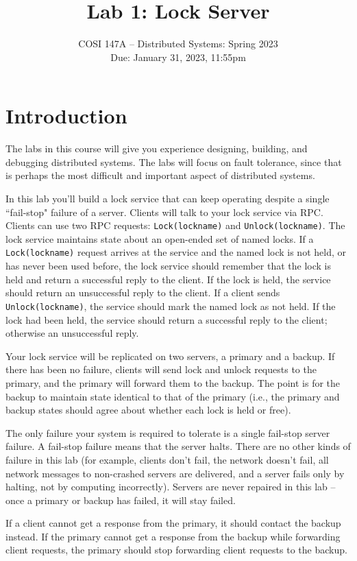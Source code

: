 \documentclass{article}
\title{Lab 1: Lock Server}
\author{COSI 147A -- Distributed Systems: Spring 2023 \\
        Due: January 31, 2023, 11:55pm}
\date{}
\newcommand{\code}{\texttt}
\begin{document}
\maketitle


\section{Introduction}
The labs in this course will give you experience designing, building, and debugging distributed systems. The labs will focus on fault tolerance, since that is perhaps the most difficult and important aspect of distributed systems.

In this lab you'll build a lock service that can keep operating despite a single ``fail-stop" failure of a server. Clients will talk to your lock service via RPC. Clients can use two RPC requests: \code{Lock(lockname)} and \code{Unlock(lockname)}. The lock service maintains state about an open-ended set of named locks. If a \code{Lock(lockname)} request arrives at the service and the named lock is not held, or has never been used before, the lock service should remember that the lock is held and return a successful reply to the client. If the lock is held, the service should return an unsuccessful reply to the client. If a client sends \code{Unlock(lockname)}, the service should mark the named lock as not held. If the lock had been held, the service should return a successful reply to the client; otherwise an unsuccessful reply.

Your lock service will be replicated on two servers, a primary and a backup. If there has been no failure, clients will send lock and unlock requests to the primary, and the primary will forward them to the backup. The point is for the backup to maintain state identical to that of the primary (i.e., the primary and backup states should agree about whether each lock is held or free).

The only failure your system is required to tolerate is a single fail-stop server failure. A fail-stop failure means that the server halts. There are no other kinds of failure in this lab (for example, clients don't fail, the network doesn't fail, all network messages to non-crashed servers are delivered, and a server fails only by halting, not by computing incorrectly). Servers are never repaired in this lab -- once a primary or backup has failed, it will stay failed.

If a client cannot get a response from the primary, it should contact the backup instead. If the primary cannot get a response from the backup while forwarding client requests, the primary should stop forwarding client requests to the backup.
\end{document}
